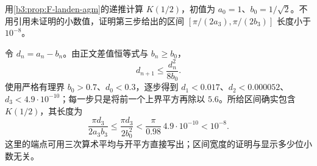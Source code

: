 \begin{exercise}\label{b3:ex:F-8}
用\cref{b3:prop:F-landen-agm}的递推计算 \(K(1/2)\)，初值为 \(a_0=1\)、\(b_0=1/\sqrt2\)。不用引用未证明的小数值，证明第三步给出的区间
\([\pi/(2a_3),\pi/(2b_3)]\) 长度小于 \(10^{-8}\)。
\end{exercise}
\begin{solution}
令 \(d_n=a_n-b_n\)。由正文差值恒等式与 \(b_n\ge b_0\)，
\[
 d_{n+1}\le\frac{d_n^2}{8b_0}.
\]
使用严格有理界 \(b_0>0.7\)、\(d_0<0.3\)，逐步得到
\(d_1<0.017\)、\(d_2<0.000052\)、\(d_3<4.9\cdot10^{-10}\)；每一步只是将前一个上界平方再除以 \(5.6\)。所给区间确实包含 \(K(1/2)\)，其长度为
\[
 \frac{\pi d_3}{2a_3b_3}
 \le\frac{\pi d_3}{2b_0^2}
 <\frac{\pi}{0.98}\,4.9\cdot10^{-10}<10^{-8}.
\]
这里的端点可用三次算术平均与开平方直接写出；区间宽度的证明与显示多少位小数无关。
\end{solution}
